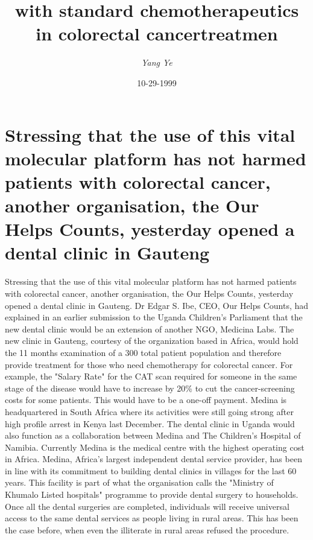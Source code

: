 \documentclass{article}%
\title{with standard chemotherapeutics in colorectal cancertreatmen}%
\author{\textit{Yang Ye}}%
\date{10-29-1999}%
\begin{document}
%
\normalsize%
\maketitle%
\section{Stressing that the use of this vital molecular platform has not harmed patients with colorectal cancer, another organisation, the Our Helps Counts, yesterday opened a dental clinic in Gauteng}%
\label{sec:Stressingthattheuseofthisvitalmolecularplatformhasnotharmedpatientswithcolorectalcancer,anotherorganisation,theOurHelpsCounts,yesterdayopenedadentalclinicinGauteng}%
Stressing that the use of this vital molecular platform has not harmed patients with colorectal cancer, another organisation, the Our Helps Counts, yesterday opened a dental clinic in Gauteng.\newline%
Dr Edgar S. Ibe, CEO, Our Helps Counts, had explained in an earlier submission to the Uganda Children's Parliament that the new dental clinic would be an extension of another NGO, Medicina Labs. The new clinic in Gauteng, courtesy of the organization based in Africa, would hold the 11 months examination of a 300 total patient population and therefore provide treatment for those who need chemotherapy for colorectal cancer.\newline%
For example, the "Salary Rate" for the CAT scan required for someone in the same stage of the disease would have to increase by 20\% to cut the cancer{-}screening costs for some patients. This would have to be a one{-}off payment.\newline%
Medina is headquartered in South Africa where its activities were still going strong after high profile arrest in Kenya last December. The dental clinic in Uganda would also function as a collaboration between Medina and The Children's Hospital of Namibia.\newline%
Currently Medina is the medical centre with the highest operating cost in Africa. Medina, Africa's largest independent dental service provider, has been in line with its commitment to building dental clinics in villages for the last 60 years. This facility is part of what the organisation calls the "Ministry of Khumalo Listed hospitals" programme to provide dental surgery to households.\newline%
Once all the dental surgeries are completed, individuals will receive universal access to the same dental services as people living in rural areas. This has been the case before, when even the illiterate in rural areas refused the procedure.\newline%
\end{document}
